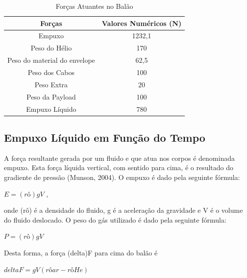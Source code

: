 \begin{table}[H]
	\centering
	\begin{tabular}{|c|c|}
		\hline
		\rowcolor[HTML]{FFFFFF} 
		{\color[HTML]{000000} \textbf{Forças}} & {\color[HTML]{000000} \textbf{Valores Numéricos (N)}} \\ \hline
		Empuxo                                 & 1232,1                                                \\ \hline
		Peso do Hélio                          & 170                                                   \\ \hline
		Peso do material do envelope           & 62,5                                                  \\ \hline
		Peso dos Cabos                         & 100                                                   \\ \hline
		Peso Extra                             & 20                                                    \\ \hline
		Peso da Payload                        & 100                                                   \\ \hline
		Empuxo Líquido                         & 780                                                   \\ \hline
	\end{tabular}
	\caption{Forças Atuantes no Balão}
	\label{tab:forcasAtuantes}
\end{table}

\subsection{Empuxo Líquido em Função do Tempo} %
\label{sub:empuxo_l_quido_em_fun_o_do_tempo}
	
	A força resultante gerada por um  fluido e que atua nos corpos é denominada empuxo. Esta força líquida vertical, com sentido para cima, é o resultado do gradiente de pressão (Munson, 2004). O empuxo é dado pela seguinte fórmula:

	$E = (rô)gV$ ,

	onde (rô) é a densidade do fluido, g é a aceleração da gravidade e V é o volume do fluido deslocado.
	O peso do gás utilizado é dado pela seguinte fórmula:
	
	$P = (rô)g V$

	Desta forma, a força (delta)F para cima do balão é
	
	$deltaF =  g V (rôar - rôHe)$
	
